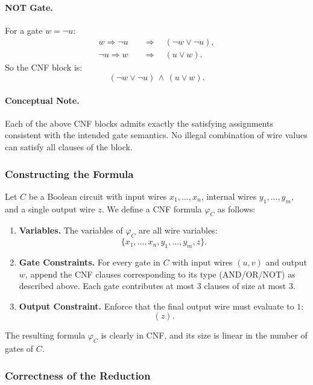 \documentclass[9pt]{extarticle}
\begin{document}
\paragraph{NOT Gate.}
For a gate $w = \neg u$:
\[
\begin{aligned}
w \Rightarrow \neg u &\quad\Rightarrow\quad (\neg w \lor \neg u),\\
\neg u \Rightarrow w &\quad\Rightarrow\quad (u \lor w).
\end{aligned}
\]
So the CNF block is:
\[
(\neg w \lor \neg u)\,\land\,(u \lor w).
\]

\paragraph{Conceptual Note.}
Each of the above CNF blocks admits exactly the satisfying assignments consistent
with the intended gate semantics.  No illegal combination of wire values can
satisfy all clauses of the block.

\subsubsection*{Constructing the Formula}

Let $C$ be a Boolean circuit with input wires $x_1,\dots,x_n$, internal wires
$y_1,\dots,y_m$, and a single output wire $z$.  We define a CNF formula
$\varphi_C$ as follows:

\begin{enumerate}
    \item \textbf{Variables.}  
    The variables of $\varphi_C$ are all wire variables:
    \[
        \{x_1,\dots,x_n, y_1,\dots,y_m, z\}.
    \]
    \item \textbf{Gate Constraints.}  
    For every gate in $C$ with input wires $(u,v)$ and output $w$, append the
    CNF clauses corresponding to its type (AND/OR/NOT) as described above.
    Each gate contributes at most $3$ clauses of size at most $3$.
    \item \textbf{Output Constraint.}
    Enforce that the final output wire must evaluate to $1$:
    \[
        (z).
    \]
\end{enumerate}

The resulting formula $\varphi_C$ is clearly in CNF, and its size is linear in
the number of gates of $C$.

\subsubsection*{Correctness of the Reduction}
\end{document}
